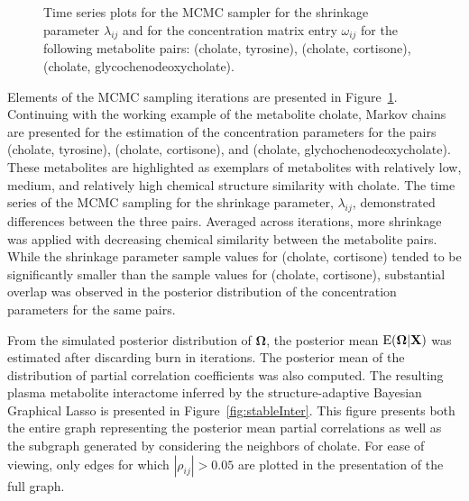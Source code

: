 \begin{DoubleSpace*}
\begin{figure}[H]
	\caption[Time series plots for the MCMC sampler for the shrinkage parameter $\lambda_{ij}$ and for the concentration matrix entry $\omega_{ij}$ for the following metabolite pairs: (cholate, tyrosine), (cholate, cortisone), (cholate, glycochenodeoxycholate)]{\DoubleSpacing Time series plots for the MCMC sampler for the shrinkage parameter $\lambda_{ij}$ and for the concentration matrix entry $\omega_{ij}$ for the following metabolite pairs: (cholate, tyrosine), (cholate, cortisone), (cholate, glycochenodeoxycholate).  \label{fig:mcmc} }
\end{figure}

Elements of the MCMC sampling iterations are presented in Figure~\ref{fig:mcmc}. Continuing with the working example of the metabolite cholate, Markov chains are presented for the estimation of the concentration parameters for the pairs (cholate, tyrosine), (cholate, cortisone), and (cholate, glychochenodeoxycholate). These metabolites are highlighted as exemplars of metabolites with relatively low, medium, and relatively high chemical structure similarity with cholate. The time series of the MCMC sampling for the shrinkage parameter, $\lambda_{ij}$, demonstrated differences between the three pairs. Averaged across iterations, more shrinkage was applied with decreasing chemical similarity between the metabolite pairs. While the shrinkage parameter sample values for (cholate, cortisone) tended to be significantly smaller than the sample values for (cholate, cortisone), substantial overlap was observed in the posterior distribution of the concentration parameters for the same pairs.

From the simulated posterior distribution of $\boldsymbol{\Omega}$, the posterior mean $\operatorname{E}(\boldsymbol{\Omega}|\textbf{X})$ was estimated after discarding burn in iterations. The posterior mean of the distribution of partial correlation coefficients was also computed. The resulting plasma metabolite interactome inferred by the structure-adaptive Bayesian Graphical Lasso is presented in Figure~\ref{fig:stableInter}. This figure presents both the entire graph representing the posterior mean partial correlations as well as the subgraph generated by considering the neighbors of cholate. For ease of viewing, only edges for which $|\rho_{ij}|>0.05$ are plotted in the presentation of the full graph. 


\end{DoubleSpace*}
